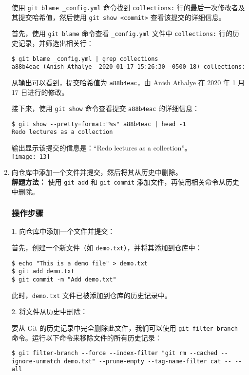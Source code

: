 \documentclass[12pt]{article}
\begin{document}
\begin{enumerate}
 使用 \texttt{git blame \_config.yml} 命令找到 \texttt{collections:} 行的最后一次修改者及其提交哈希值，然后使用 \texttt{git show <commit>} 查看该提交的详细信息。


首先，使用 \texttt{git blame} 命令查看 \texttt{\_config.yml} 文件中 \texttt{collections:} 行的历史记录，并筛选出相关行：

\begin{verbatim}
$ git blame _config.yml | grep collections
a88b4eac (Anish Athalye  2020-01-17 15:26:30 -0500 18) collections:
\end{verbatim}

从输出可以看到，提交哈希值为 \texttt{a88b4eac}，由 Anish Athalye 在 2020 年 1 月 17 日进行的修改。

接下来，使用 \texttt{git show} 命令查看提交 \texttt{a88b4eac} 的详细信息：

\begin{verbatim}
$ git show --pretty=format:"%s" a88b4eac | head -1
Redo lectures as a collection
\end{verbatim}

输出显示该提交的信息是：“Redo lectures as a collection”。\\
\texttt{[image: 13]}
    
    \item 向仓库中添加一个文件并提交，然后将其从历史中删除。\\
    \textbf{解题方法：} 使用 \texttt{git add} 和 \texttt{git commit} 添加文件，再使用相关命令从历史中删除。
    \subsubsection*{操作步骤}

1. 向仓库中添加一个文件并提交：

首先，创建一个新文件（如 \texttt{demo.txt}），并将其添加到仓库中：

\begin{verbatim}
$ echo "This is a demo file" > demo.txt
$ git add demo.txt
$ git commit -m "Add demo.txt"
\end{verbatim}

此时，\texttt{demo.txt} 文件已被添加到仓库的历史记录中。

2. 将文件从历史中删除：

要从 Git 的历史记录中完全删除此文件，我们可以使用 \texttt{git filter-branch} 命令。运行以下命令来移除文件的所有历史记录：

\begin{verbatim}
$ git filter-branch --force --index-filter "git rm --cached --ignore-unmatch demo.txt" --prune-empty --tag-name-filter cat -- --all
\end{verbatim}


\end{enumerate}
\end{document}

